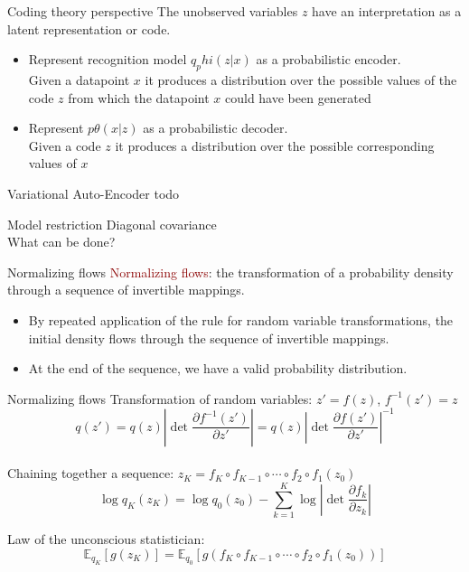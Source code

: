 \documentclass[unicode,11pt]{beamer}
\begin{document}
\begin{frame}[fragile]{Coding theory perspective}
The unobserved variables $z$ have an interpretation as a latent representation or code.

\begin{itemize}
  \item Represent recognition model $q_phi(z|x)$ as a probabilistic encoder.\\
        Given a datapoint $x$ it produces a distribution over the possible values of the code $z$ from which the datapoint $x$ could have been generated
  \item Represent $p\theta(x|z)$ as a probabilistic decoder.\\
        Given a code $z$ it produces a distribution over the possible corresponding values of $x$
\end{itemize}
\end{frame}

\begin{frame}[fragile]{Variational Auto-Encoder}
todo 
\end{frame}


\begin{frame}[fragile]{Model restriction}
Diagonal covariance\\
\vspace{5mm}
What can be done?
\end{frame}


\begin{frame}[fragile]{Normalizing flows}
\textcolor{darkred}{Normalizing flows}: the transformation of a probability density through
a sequence of invertible mappings.
\begin{itemize}
  \item By repeated application of the rule for random variable transformations, the initial
density flows through the sequence of invertible mappings.
  \item At the end of the sequence, we have a valid probability distribution.
\end{itemize}

\end{frame}

\begin{frame}[fragile]{Normalizing flows}
Transformation of random variables: $z' = f(z)$, $f^{-1}(z') = z$\\
$$q(z') = q(z) \left\vert \det \frac{\partial f^{-1}(z')}{\partial z'} \right\vert = 
q(z) \left\vert \det \frac{\partial f(z')}{\partial z'} \right\vert^{-1}$$\\
Chaining together a sequence: $z_K = f_K \circ f_{K−1} \circ \cdots \circ f_2 \circ f_1(z_0)$\\
$$\log q_K(z_K) = \log q_0(z_0) − \sum_{k=1}^K \log \left\vert \det \frac{\partial f_k}{\partial z_k} \right\vert $$

Law of the unconscious statistician:\\
$$\mathbb{E}_{q_K} \left[g(z_K)\right] = \mathbb{E}_{q_0} \left[ g(f_K \circ f_{K−1} \circ \cdots \circ f_2 \circ f_1(z_0)) \right] $$
\end{frame}
\end{document}
